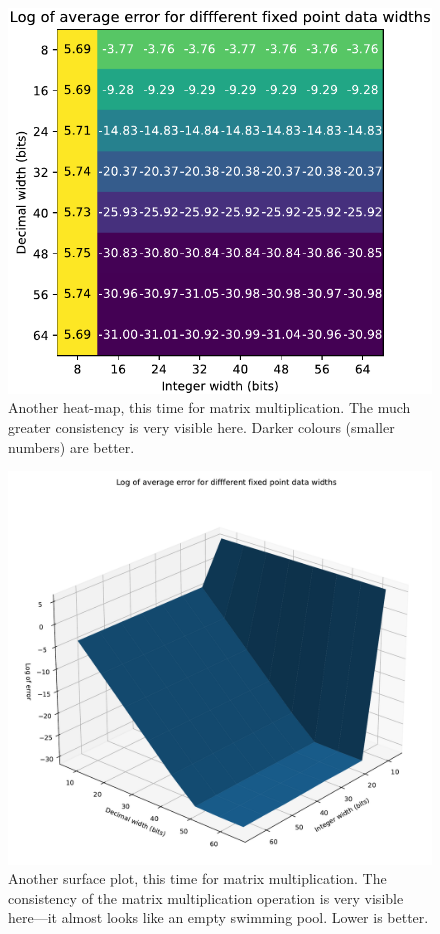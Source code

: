 \documentclass[12pt]{article}
\begin{document}
\begin{figure}[thp]
	\centering
	
	\includegraphics[width=\textwidth]{heatmap_full_mul.pdf}
	
	\caption{Another heat-map, this time for matrix multiplication. The much greater consistency is very visible here. Darker colours (smaller numbers) are better.}
	\label{full_heat_mul}
\end{figure}

\begin{figure}[thp]
	\centering
	
	\includegraphics[width=\textwidth]{sfc_plot_full_mul.pdf}
	
	\caption{Another surface plot, this time for matrix multiplication. The consistency of the matrix multiplication operation is very visible here---it almost looks like an empty swimming pool. Lower is better.}
	\label{full_sfc_mul}
\end{figure}
\end{document}

